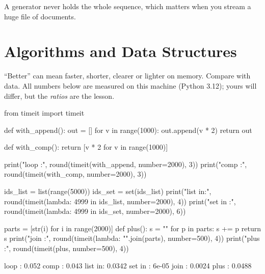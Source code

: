 A generator never holds the whole sequence, which matters when you stream a huge file of
documents.

\section{Algorithms and Data Structures}

``Better'' can mean faster, shorter, clearer or lighter on memory. Compare with data. All numbers
below are measured on this machine (Python 3.12); yours will differ, but the \emph{ratios} are the
lesson.

\begin{pycode}
from timeit import timeit

def with_append():
    out = []
    for v in range(1000):
        out.append(v * 2)
    return out

def with_comp():
    return [v * 2 for v in range(1000)]

print("loop :", round(timeit(with_append, number=2000), 3))
print("comp :", round(timeit(with_comp, number=2000), 3))

ids_list = list(range(5000))
ids_set = set(ids_list)
print("list in:", round(timeit(lambda: 4999 in ids_list, number=2000), 4))
print("set in :", round(timeit(lambda: 4999 in ids_set, number=2000), 6))

parts = [str(i) for i in range(2000)]
def plus():
    s = ""
    for p in parts:
        s += p
    return s
print("join :", round(timeit(lambda: "".join(parts), number=500), 4))
print("plus :", round(timeit(plus, number=500), 4))
\end{pycode}
\begin{rawcode}
loop : 0.052
comp : 0.043
list in: 0.0342
set in : 6e-05
join : 0.0024
plus : 0.0488
\end{rawcode}

